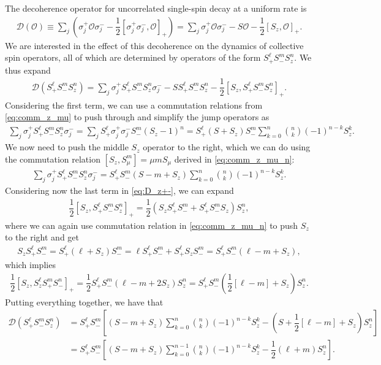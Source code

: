 \documentclass[aps,notitlepage,nofootinbib,11pt]{revtex4-1}
\newcommand{\f}[2]{\dfrac{#1}{#2}} %
\newcommand{\p}[1]{\left(#1\right)} %
\renewcommand{\sp}[1]{\left[#1\right]} %
\newcommand{\D}{\mathcal{D}}
\renewcommand{\O}{\mathcal{O}}
\newcommand{\1}{\mathds{1}}
\begin{document}
The decoherence operator for uncorrelated single-spin decay at a
uniform rate is
\begin{align}
  \D\p{\O}
  \equiv \sum_j\p{\sigma_j^+\O\sigma_j^-
    - \f12\sp{\sigma_j^+\sigma_j^-,\O}_+}
  = \sum_j \sigma_j^+\O\sigma_j^- - S \O - \f12 \sp{S_z,\O}_+.
\end{align}
We are interested in the effect of this decoherence on the dynamics of
collective spin operators, all of which are determined by operators of
the form $S_+^\ell S_-^m S_z^n$.  We thus expand
\begin{align}
  \D\p{S_+^\ell S_-^m S_z^n}
  = \sum_j \sigma_j^+ S_+^\ell S_-^m S_z^n \sigma_j^-
  - S S_+^\ell S_-^m S_z^n - \f12 \sp{S_z, S_+^\ell S_-^m S_z^n}_+.
  \label{eq:D_z+-}
\end{align}
Considering the first term, we can use a commutation relations from
\eqref{eq:comm_z_mu} to push through and simplify the jump operators
as
\begin{align}
  \sum_j \sigma_j^+ S_+^\ell S_-^m S_z^n \sigma_j^-
  = \sum_j S_+^\ell \sigma_j^+ \sigma_j^- S_-^m \p{S_z-1}^n
  = S_+^\ell \p{S + S_z} S_-^m
  \sum_{k=0}^n { n \choose k } \p{-1}^{n-k} S_z^k.
\end{align}
We now need to push the middle $S_z$ operator to the right, which we
can do using the commutation relation $\sp{S_z,S_\mu^m}=\mu mS_\mu$
derived in \eqref{eq:comm_z_mu_n}:
\begin{align}
  \sum_j \sigma_j^+ S_+^\ell S_-^m S_z^n \sigma_j^-
  = S_+^\ell S_-^m \p{S - m + S_z}
  \sum_{k=0}^n { n \choose k } \p{-1}^{n-k} S_z^k.
\end{align}
Considering now the last term in \eqref{eq:D_z+-}, we can expand
\begin{align}
  \f12 \sp{S_z, S_+^\ell S_-^m S_z^n}_+
  = \f12 \p{S_z S_+^\ell S_-^m + S_+^\ell S_-^m S_z} S_z^n,
\end{align}
where we can again use commutation relation in \eqref{eq:comm_z_mu_n}
to push $S_z$ to the right and get
\begin{align}
  S_z S_+^\ell S_-^m
  = S_+^\ell \p{\ell + S_z} S_-^m
  = \ell S_+^\ell S_-^m + S_+^\ell S_z S_-^m
  = S_+^\ell S_-^m \p{\ell - m + S_z},
\end{align}
which implies
\begin{align}
  \f12 \sp{S_z, S_z^\ell S_+^m S_-^n}_+
  = \f12 S_+^\ell S_-^m \p{\ell - m + 2 S_z} S_z^n
  = S_+^\ell S_-^m \p{\f12\sp{\ell-m} + S_z} S_z^n.
\end{align}
Putting everything together, we have that
\begin{align}
  \D\p{S_+^\ell S_-^m S_z^n}
  &= S_+^\ell S_-^m \sp{\p{S - m + S_z} \sum_{k=0}^n
    { n \choose k } \p{-1}^{n-k} S_z^k
    - \p{S + \f12\sp{\ell-m} + S_z} S_z^n} \\
  &= S_+^\ell S_-^m \sp{\p{S - m + S_z} \sum_{k=0}^{n-1}
    { n \choose k } \p{-1}^{n-k} S_z^k - \f12 \p{\ell+m} S_z^n}.
\end{align}
\end{document}
